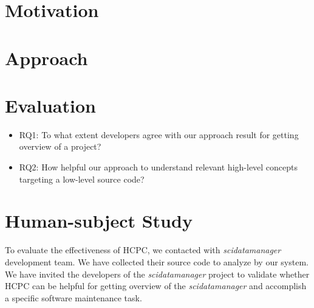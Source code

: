 \section{Motivation}

\section{Approach}

\section{Evaluation}

\begin{itemize}
    \item RQ1: To what extent developers agree with our approach result for getting overview of a project?
    \item RQ2: How helpful our approach to understand relevant high-level concepts targeting a low-level source code?
\end{itemize}

\section{Human-subject Study}
To evaluate the effectiveness of HCPC, we contacted with \emph{scidatamanager} development team. We have collected their source code to analyze by our system. We have invited the developers of the \emph{scidatamanager} project to validate whether HCPC can be helpful for getting overview of the \emph{scidatamanager} and accomplish a specific software maintenance task.
